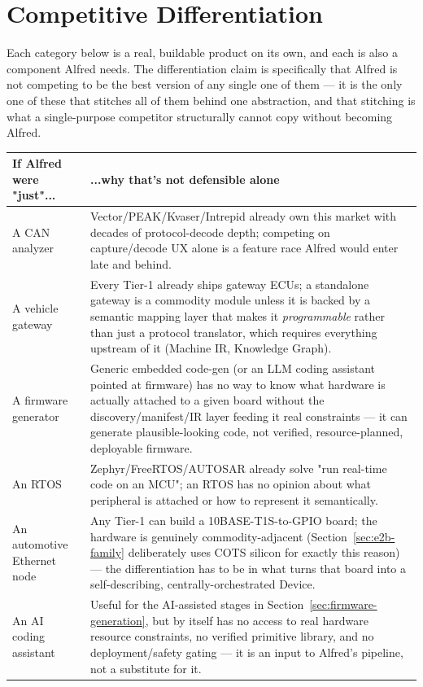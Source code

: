 \section{Competitive Differentiation}
\label{sec:differentiation}

Each category below is a real, buildable product on its own, and each is also a component Alfred needs. The differentiation claim is specifically that Alfred is not competing to be the best version of any single one of them --- it is the only one of these that stitches all of them behind one abstraction, and that stitching is what a single-purpose competitor structurally cannot copy without becoming Alfred.

\begin{center}
\small
\begin{tabularx}{\linewidth}{@{}p{2.6cm} X@{}}
\toprule
\textbf{If Alfred were "just"...} & \textbf{...why that's not defensible alone} \\
\midrule
A CAN analyzer & Vector/PEAK/Kvaser/Intrepid already own this market with decades of protocol-decode depth; competing on capture/decode UX alone is a feature race Alfred would enter late and behind. \\
A vehicle gateway & Every Tier-1 already ships gateway ECUs; a standalone gateway is a commodity module unless it is backed by a semantic mapping layer that makes it \emph{programmable} rather than just a protocol translator, which requires everything upstream of it (Machine IR, Knowledge Graph). \\
A firmware generator & Generic embedded code-gen (or an LLM coding assistant pointed at firmware) has no way to know what hardware is actually attached to a given board without the discovery/manifest/IR layer feeding it real constraints --- it can generate plausible-looking code, not verified, resource-planned, deployable firmware. \\
An RTOS & Zephyr/FreeRTOS/AUTOSAR already solve "run real-time code on an MCU"; an RTOS has no opinion about what peripheral is attached or how to represent it semantically. \\
An automotive Ethernet node & Any Tier-1 can build a 10BASE-T1S-to-GPIO board; the hardware is genuinely commodity-adjacent (Section~\ref{sec:e2b-family} deliberately uses COTS silicon for exactly this reason) --- the differentiation has to be in what turns that board into a self-describing, centrally-orchestrated Device. \\
An AI coding assistant & Useful for the AI-assisted stages in Section~\ref{sec:firmware-generation}, but by itself has no access to real hardware resource constraints, no verified primitive library, and no deployment/safety gating --- it is an input to Alfred's pipeline, not a substitute for it. \\

\end{tabularx}
\end{center}

